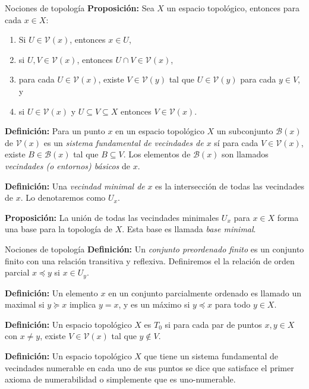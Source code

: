 \documentclass[9pt]{beamer}
\begin{document}
\begin{frame}{Nociones de topología}
\textbf{Proposición:} Sea $X$ un espacio topológico, entonces para cada $x\in X$:
\begin{enumerate}
    \item Si $U\in\mathcal{V}(x)$, entonces $x\in U$,
    \item si $U,V\in\mathcal{V}(x)$, entonces $U\cap V\in\mathcal{V}(x)$,
    \item para cada $U\in\mathcal{V}(x)$, existe $V\in\mathcal{V}(y)$ tal que $U\in\mathcal{V}(y)$ para cada $y\in V$, y 
    \item si $U\in\mathcal{V}(x)$ y $U\subseteq V\subseteq X$ entonces $V\in\mathcal{V}(x)$.
\end{enumerate}

\textbf{Definición:} Para un punto $x$ en un espacio topológico $X$ un subconjunto $\mathcal{B}(x)$ de $\mathcal{V}(x)$ es un \textit{sistema fundamental de vecindades de $x$} sí para cada $V\in\mathcal{V}(x)$, existe $B\in\mathcal{B}(x)$ tal que $B\subseteq V$. Los elementos de $\mathcal{B}(x)$ son llamados \textit{vecindades (o entornos) básicos} de $x$.

\textbf{Definición:} Una \textit{vecindad minimal de} $x$ es la intersección de todas las vecindades de $x$. Lo denotaremos como $U_x$.

\textbf{Proposición:} La unión de todas las vecindades minimales $U_x$ para $x\in X$ forma una base para la topología de $X$. Esta base es llamada \textit{base minimal}.
\end{frame}

\begin{frame}{Nociones de topología}
\textbf{Definición:} Un \textit{conjunto preordenado finito} es un conjunto finito con una relación transitiva y reflexiva. Definiremos el la relación de orden parcial $x\preceq y$ si $x\in U_y$.

\textbf{Definición:} Un elemento $x$ en un conjunto parcialmente ordenado es llamado un maximal si $y\succeq x$ implica $y=x$, y es un máximo si $y\preceq x$ para todo $y\in X$.

\textbf{Definición:} Un espacio topológico $X$ es $T_0$ si para cada par de puntos $x,y\in X$ con $x\neq y$, existe $V\in\mathcal{V}(x)$ tal que $y\notin V$.

\textbf{Definición:} Un espacio topológico $X$ que tiene un sistema fundamental de vecindades numerable en cada uno de sus puntos se dice que satisface el primer axioma de numerabilidad o simplemente que es uno-numerable.
\end{frame}
\end{document}
